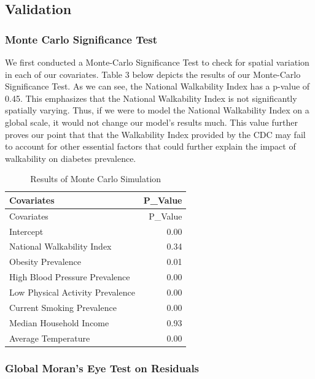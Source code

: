 \documentclass[
]{article}
\begin{document}
\subsection{Validation}\label{validation-1}

\subsubsection{Monte Carlo Significance
Test}\label{monte-carlo-significance-test}

We first conducted a Monte-Carlo Significance Test to check for spatial
variation in each of our covariates. Table 3 below depicts the results
of our Monte-Carlo Significance Test. As we can see, the National
Walkability Index has a p-value of 0.45. This emphasizes that the
National Walkability Index is not significantly spatially varying. Thus,
if we were to model the National Walkability Index on a global scale, it
would not change our model's results much. This value further proves our
point that that the Walkability Index provided by the CDC may fail to
account for other essential factors that could further explain the
impact of walkability on diabetes prevalence.

\begin{longtable}[]{@{}lr@{}}
\caption{Results of Monte Carlo Simulation}\tabularnewline
\toprule\noalign{}
Covariates & P\_Value \\
\midrule\noalign{}
\endfirsthead
\toprule\noalign{}
Covariates & P\_Value \\
\midrule\noalign{}
\endhead
\bottomrule\noalign{}
\endlastfoot
Intercept & 0.00 \\
National Walkability Index & 0.34 \\
Obesity Prevalence & 0.01 \\
High Blood Pressure Prevalence & 0.00 \\
Low Physical Activity Prevalence & 0.00 \\
Current Smoking Prevalence & 0.00 \\
Median Household Income & 0.93 \\
Average Temperature & 0.00 \\
\end{longtable}

\subsubsection{Global Moran's Eye Test on
Residuals}\label{global-morans-eye-test-on-residuals}
\end{document}
